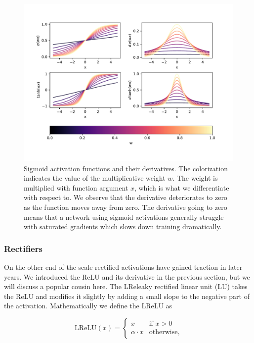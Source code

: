 \begin{figure}
\centering
\includegraphics[width=\textwidth]{../figures/activationssigmoids.pdf}
\caption[Sigmoid activation functions]{Sigmoid activation functions and their derivatives. The colorization indicates the value of the multiplicative weight $w$. The weight is multiplied with function argument $x$, which is what we differentiate with respect to.  We observe that the derivative deteriorates to zero as the function moves away from zero. The derivative going to zero means that a network using sigmoid activations generally struggle with saturated gradients which slows down training dramatically.}\label{fig:sigmoid}
\end{figure}

\subsubsection{Rectifiers}

On the other end of the scale rectified activations have gained traction in later years. We introduced the ReLU and its derivative in the previous section, but we will discuss a popular cousin here. The LReleaky rectified linear unit (LU) takes the ReLU and modifies it slightly by adding a small slope to the negative part of the activation. Mathematically we define the LReLU as 

\begin{equation}\label{eq:lrelu}
    \text{LReLU} (x)  = \begin{cases}
    x & \text{if } x > 0 \\
    \alpha\cdot x  & \text{otherwise},
    \end{cases}
\end{equation}

